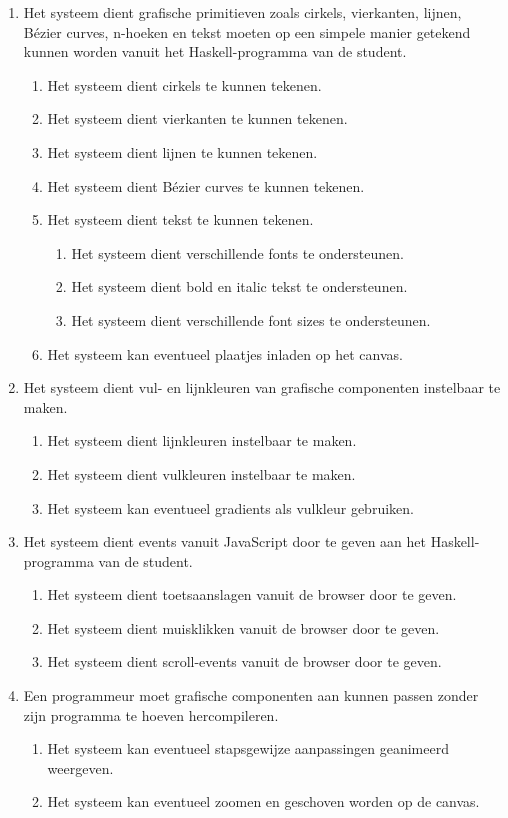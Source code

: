 \begin{enumerate}[{R}1]
	\item Het systeem dient grafische primitieven zoals cirkels, vierkanten, lijnen, Bézier curves, n-hoeken en tekst moeten op een simpele manier getekend kunnen worden vanuit het Haskell-programma van de student.
	\begin{enumerate}
		\item Het systeem dient cirkels te kunnen tekenen.
		\item Het systeem dient vierkanten te kunnen tekenen.
		\item Het systeem dient lijnen te kunnen tekenen.
		\item Het systeem dient Bézier curves te kunnen tekenen.
		\item Het systeem dient tekst te kunnen tekenen.
		\begin{enumerate}
			\item Het systeem dient verschillende fonts te ondersteunen.
			\item Het systeem dient bold en italic tekst te ondersteunen.
			\item Het systeem dient verschillende font sizes te ondersteunen.
		\end{enumerate}
		\item Het systeem kan eventueel plaatjes inladen op het canvas.
	\end{enumerate}
	\item Het systeem dient vul- en lijnkleuren van grafische componenten instelbaar te maken.
	\begin{enumerate}
		\item Het systeem dient lijnkleuren instelbaar te maken.
		\item Het systeem dient vulkleuren instelbaar te maken.
		\item Het systeem kan eventueel gradients als vulkleur gebruiken.
	\end{enumerate}
	\item Het systeem dient events vanuit JavaScript door te geven aan het Haskell-programma van de student.
	\begin{enumerate}
		\item Het systeem dient toetsaanslagen vanuit de browser door te geven.
		\item Het systeem dient muisklikken vanuit de browser door te geven.
		\item Het systeem dient scroll-events vanuit de browser door te geven.
	\end{enumerate}
	\item Een programmeur moet grafische componenten aan kunnen passen zonder zijn programma te hoeven hercompileren.
	\begin{enumerate}
		\item Het systeem kan eventueel stapsgewijze aanpassingen geanimeerd weergeven.
		\item Het systeem kan eventueel zoomen en geschoven worden op de canvas.
	\end{enumerate}
	\setcounter{startvalue}{\value{enumi}}
\end{enumerate}


